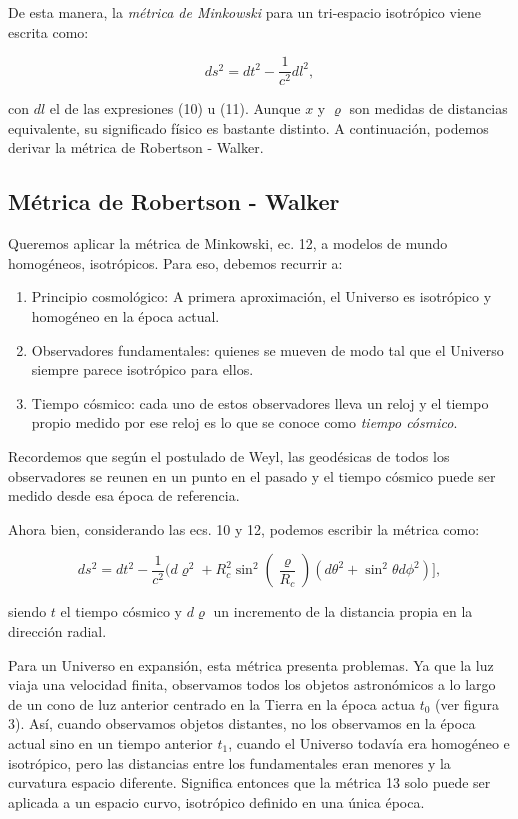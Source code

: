 \documentclass{article}
\begin{document}
De esta manera, la {\textit{métrica de Minkowski}} para un tri-espacio isotrópico viene escrita como: 

\begin{equation}
    ds^2 = dt^2 - \frac{1}{c^2} dl^2,
\end{equation}

con $dl$ el de las expresiones (10) u (11). Aunque $x$ y $\varrho$ son medidas de distancias equivalente, su significado físico es bastante distinto. A continuación, podemos derivar la métrica de Robertson -  Walker. 


\subsection{Métrica de Robertson - Walker}

Queremos aplicar la métrica de Minkowski, ec. 12, a modelos de mundo homogéneos, isotrópicos. Para eso, debemos recurrir a:

    \begin{enumerate}
        \item Principio cosmológico: A primera aproximación, el Universo es isotrópico y homogéneo en la época actual.
        \item Observadores fundamentales: quienes se mueven de modo tal que el Universo siempre parece isotrópico para ellos. 
        \item Tiempo cósmico: cada uno de estos observadores lleva un reloj y el tiempo propio medido por ese reloj es lo que se conoce como {\textit{tiempo cósmico}}.
    \end{enumerate}
    
Recordemos que según el postulado de Weyl, las geodésicas de todos los observadores se reunen en un punto en el pasado y el tiempo cósmico puede ser medido desde esa época de referencia. 

Ahora bien, considerando las ecs. 10 y 12, podemos escribir la métrica como:

    \begin{equation}
        ds^2 = dt^2 - \frac{1}{c^2}( d\varrho^2 + R_c^2 \sin^2\left(\frac{\varrho}{R_c} \right) (d\theta^2 +  \sin^2 \theta d\phi^2)],
    \end{equation}

siendo $t$ el tiempo cósmico y $d\varrho$ un incremento de la distancia propia en la dirección radial. 

Para un Universo en expansión, esta métrica presenta problemas. Ya que la luz viaja una velocidad finita, observamos todos los objetos astronómicos a lo largo de un cono de luz anterior centrado en la Tierra en la época actua $t_0$ (ver figura 3). Así, cuando observamos objetos distantes, no los observamos en la época actual sino en un tiempo anterior $t_1$, cuando el Universo todavía era homogéneo e isotrópico, pero las distancias entre los fundamentales eran menores y la curvatura espacio diferente. Significa entonces que la métrica 13 solo puede ser aplicada a un espacio curvo, isotrópico definido en una única época. 
\end{document}
